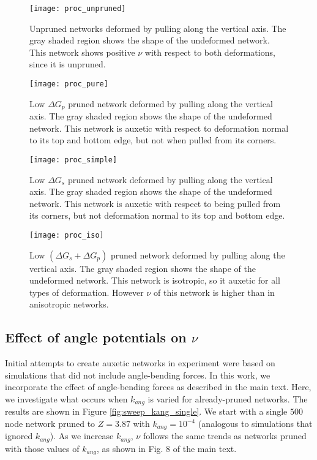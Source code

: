\documentclass[9pt,twocolumn,twoside]{pnas-new}
\begin{document}
 \begin{figure*}[t!]
 	\centering
   	\texttt{[image: proc\_unpruned]}
	\caption{Unpruned networks deformed by pulling along the vertical axis.  The gray shaded region shows the shape of the undeformed network. This network shows positive $\nu$ with respect to both deformations, since it is unpruned.}
	\label{fig:unpruned}
\end{figure*}
 \begin{figure*}[t!]
 	\centering
   	\texttt{[image: proc\_pure]}
	\caption{Low $\Delta G_{p}$ pruned network deformed by pulling along the vertical axis.  The gray shaded region shows the shape of the undeformed network. This network is auxetic with respect to deformation normal to its top and bottom edge, but not when pulled from its corners. }
	\label{fig:pure}
\end{figure*}
 \begin{figure*}[t!]
 	\centering
   	\texttt{[image: proc\_simple]}
	\caption{Low $\Delta G_{s}$ pruned network deformed by pulling along the vertical axis.  The gray shaded region shows the shape of the undeformed network.  This network is auxetic with respect to being pulled from its corners, but not deformation normal to its top and bottom edge. }
	\label{fig:simple}
\end{figure*}


 
 \begin{figure*}[t!]
 	\centering
   	\texttt{[image: proc\_iso]}
	\caption{Low $(\Delta G_{s}+\Delta G_{p})$ pruned network deformed by pulling along the vertical axis.  The gray shaded region shows the shape of the undeformed network.  This network is isotropic, so it auxetic for all types of deformation. However $\nu$ of this network is higher than in anisotropic networks.}
	\label{fig:iso}
\end{figure*}

 \subsection*{Effect of angle potentials on $\nu$}
Initial attempts to create auxetic networks in experiment were based on simulations that did not include angle-bending forces. In this work, we incorporate the effect of angle-bending forces as described in the main text.  Here, we investigate what occurs when $k_{ang}$ is varied for already-pruned networks.  The results are shown in Figure \ref{fig:sweep_kang_single}. We start with a single $500$ node network pruned to $Z=3.87$ with $k_{ang}=10^{-4}$ (analogous to simulations that ignored $k_{ang}$).  As we increase $k_{ang}$, $\nu$ follows the same trends as networks pruned with those values of $k_{ang}$, as shown in Fig. 8 of the main text.    
\end{document}
